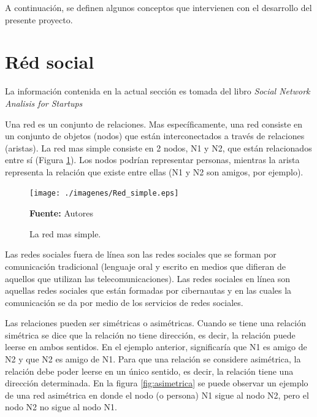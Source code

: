 A continuación, se definen algunos conceptos que intervienen con el desarrollo del presente proyecto.





\section{Réd social}

La información contenida en la actual sección es tomada del libro \textit{Social Network Analisis for Startups} \cite{sna_startups}

Una red es un conjunto de relaciones. Mas específicamente, una red consiste en un conjunto de objetos (nodos) que están interconectados a través de relaciones (aristas). La red mas simple consiste en 2 nodos, N1 y N2, que están relacionados entre sí (Figura \ref{fig:simple}). Los nodos podrían representar personas, mientras la arista representa la relación que existe entre ellas (N1 y N2 son amigos, por ejemplo).

\begin{figure}[!htb]
  \begin{center}
    \texttt{[image: ./imagenes/Red\_simple.eps]}
    \caption{La red mas simple.}
    \label{fig:simple}
    \textbf{Fuente:}  Autores
  \end{center}
\end{figure}

Las redes sociales fuera de línea son las redes sociales que se forman por comunicación tradicional (lenguaje oral y escrito en medios que difieran de aquellos que utilizan las telecomunicaciones). Las redes sociales en línea son aquellas redes sociales que están formadas por cibernautas y en las cuales la comunicación se da por medio de los servicios de redes sociales. \cite{analysis}

Las relaciones pueden ser simétricas o asimétricas. Cuando se tiene una relación simétrica se dice que la relación no tiene dirección, es decir, la relación puede leerse en ambos sentidos. En el ejemplo anterior, significaría que N1 es amigo de N2 y que N2 es amigo de N1. Para que una relación se considere asimétrica, la relación debe poder leerse en un único sentido, es decir, la relación tiene una dirección determinada. En la figura \ref{fig:asimetrica} se puede observar un ejemplo de una red asimétrica en donde el nodo (o persona) N1 sigue al nodo N2, pero el nodo N2 no sigue al nodo N1.


